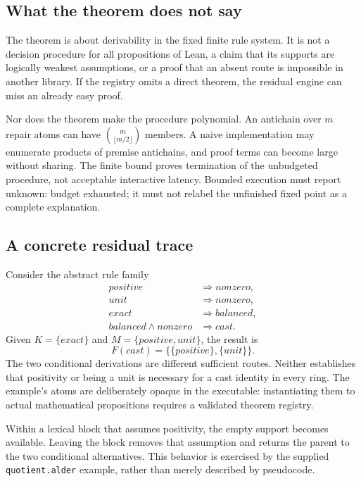 \documentclass[11pt,a4paper]{article}
\newcommand{\code}[1]{\nolinkurl{#1}}
\newcommand{\kw}[1]{\textsf{#1}}
\theoremstyle{plain}
\theoremstyle{definition}
\theoremstyle{remark}
\begin{document}
\subsection{What the theorem does not say}
The theorem is about derivability in the fixed finite rule system. It is not a decision procedure for all propositions of Lean, a claim that its supports are logically weakest assumptions, or a proof that an absent route is impossible in another library. If the registry omits a direct theorem, the residual engine can miss an already easy proof.

Nor does the theorem make the procedure polynomial. An antichain over $m$ repair atoms can have $\binom{m}{\lfloor m/2\rfloor}$ members. A naive implementation may enumerate products of premise antichains, and proof terms can become large without sharing. The finite bound proves termination of the unbudgeted procedure, not acceptable interactive latency. Bounded execution must report \kw{unknown: budget exhausted}; it must not relabel the unfinished fixed point as a complete explanation.

\subsection{A concrete residual trace}
Consider the abstract rule family
\begin{align*}
 \mathit{positive}&\Rightarrow\mathit{nonzero},\\
 \mathit{unit}&\Rightarrow\mathit{nonzero},\\
 \mathit{exact}&\Rightarrow\mathit{balanced},\\
 \mathit{balanced}\wedge\mathit{nonzero}&\Rightarrow\mathit{cast}.
\end{align*}
Given $K=\{\mathit{exact}\}$ and $M=\{\mathit{positive},\mathit{unit}\}$, the result is
\[
 F(\mathit{cast})=
 \bigl\{\{\mathit{positive}\},\{\mathit{unit}\}\bigr\}.
\]
The two conditional derivations are different sufficient routes. Neither establishes that positivity or being a unit is necessary for a cast identity in every ring. The example's atoms are deliberately opaque in the executable: instantiating them to actual mathematical propositions requires a validated theorem registry.

Within a lexical block that assumes positivity, the empty support becomes available. Leaving the block removes that assumption and returns the parent to the two conditional alternatives. This behavior is exercised by the supplied \code{quotient.alder} example, rather than merely described by pseudocode.
\end{document}
